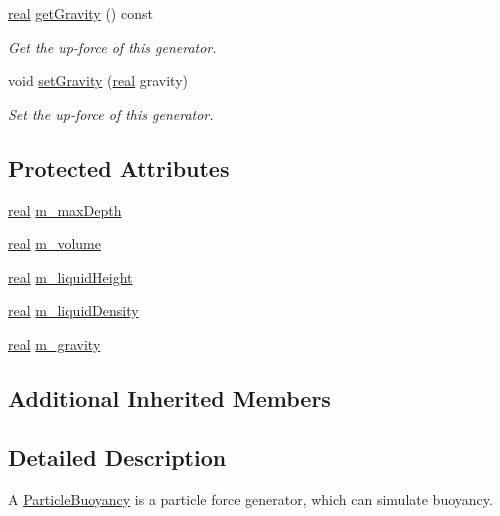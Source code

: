\begin{DoxyCompactItemize}
\mbox{\hyperlink{namespacer3_ab2016b3e3f743fb735afce242f0dc1eb}{real}} \mbox{\hyperlink{classr3_1_1_particle_buoyancy_a10eb48db4677b687b49e2478fed25919}{get\+Gravity}} () const
\begin{DoxyCompactList}\small\item\em Get the up-\/force of this generator. \end{DoxyCompactList}\item 
void \mbox{\hyperlink{classr3_1_1_particle_buoyancy_a2e538fa2b683ee35d2fd1cfe30bc8216}{set\+Gravity}} (\mbox{\hyperlink{namespacer3_ab2016b3e3f743fb735afce242f0dc1eb}{real}} gravity)
\begin{DoxyCompactList}\small\item\em Set the up-\/force of this generator. \end{DoxyCompactList}\end{DoxyCompactItemize}
\subsection*{Protected Attributes}
\begin{DoxyCompactItemize}
\item 
\mbox{\hyperlink{namespacer3_ab2016b3e3f743fb735afce242f0dc1eb}{real}} \mbox{\hyperlink{classr3_1_1_particle_buoyancy_a6e79de3d4dc7861fefc3aae9a08aab00}{m\+\_\+max\+Depth}}
\item 
\mbox{\hyperlink{namespacer3_ab2016b3e3f743fb735afce242f0dc1eb}{real}} \mbox{\hyperlink{classr3_1_1_particle_buoyancy_ade7d34f053371dadc2113563760599c9}{m\+\_\+volume}}
\item 
\mbox{\hyperlink{namespacer3_ab2016b3e3f743fb735afce242f0dc1eb}{real}} \mbox{\hyperlink{classr3_1_1_particle_buoyancy_a4fddd40b8ed38a245807f1ff6ebf374e}{m\+\_\+liquid\+Height}}
\item 
\mbox{\hyperlink{namespacer3_ab2016b3e3f743fb735afce242f0dc1eb}{real}} \mbox{\hyperlink{classr3_1_1_particle_buoyancy_a6a62107ee9e97a640371bf3a1aaf92cc}{m\+\_\+liquid\+Density}}
\item 
\mbox{\hyperlink{namespacer3_ab2016b3e3f743fb735afce242f0dc1eb}{real}} \mbox{\hyperlink{classr3_1_1_particle_buoyancy_a619b460c0ac8b80c4470f2784f81cc8d}{m\+\_\+gravity}}
\end{DoxyCompactItemize}
\subsection*{Additional Inherited Members}


\subsection{Detailed Description}
A \mbox{\hyperlink{classr3_1_1_particle_buoyancy}{Particle\+Buoyancy}} is a particle force generator, which can simulate buoyancy. 

